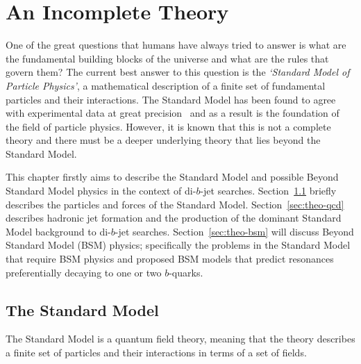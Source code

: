 \chapter{An Incomplete Theory}
\label{sec:theo}

One of the great questions that humans have always tried to answer is
what are the fundamental building blocks of the universe and what are the rules that govern them?
%
The current best answer to this question is the \textit{`Standard Model of Particle Physics'},
a mathematical description of a finite set of fundamental particles and their interactions.
The Standard Model has been found to agree with experimental data at great precision~\cite{theo-ewTests}
and as a result is the foundation of the field of particle physics.
However, it is known that this is not a complete theory and there must be
a deeper underlying theory that lies beyond the Standard Model.

This chapter firstly aims to describe the Standard Model and
possible Beyond Standard Model physics in the context of di-$b$-jet searches.
Section~\ref{sec:theo-sm} briefly describes the particles and forces of the Standard Model.
Section~\ref{sec:theo-qcd} describes hadronic jet formation and the production of the dominant Standard Model background to di-$b$-jet searches.
Section~\ref{sec:theo-bsm} will discuss Beyond Standard Model (BSM) physics;
specifically the problems in the Standard Model that require BSM physics
and proposed BSM models that predict resonances preferentially decaying to one or two $b$-quarks.

\section{The Standard Model}
\label{sec:theo-sm}

The Standard Model is a quantum field theory,
meaning that the theory describes a finite set of particles and their interactions in
terms of a set of fields.


